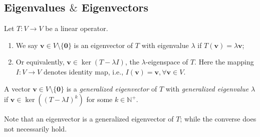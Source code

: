 \subsection{Eigenvalues $\&$ Eigenvectors}
\begin{definition}[Eigenvalues]
Let $T:V\to V$ be a linear operator.
\begin{enumerate}
\item
We say $\bm v\in V\setminus\{\bm0\}$ is an eigenvector of $T$ with eigenvalue $\lambda$ if 
$T(\bm v) = \lambda\bm v$;
\item
Or equivalently, $\bm v\in\ker(T-\lambda I)$, the $\lambda$-eigenspace of $T$. Here the mapping $I:V\to V$ denotes identity map, i.e., $I(\bm v)=\bm v,\forall \bm v\in V$.
\end{enumerate}
\end{definition}
\begin{definition}
A vector $\bm v\in V\setminus\{\bm0\}$ is a \emph{generalized eigenvector} of $T$ with \emph{generalized eigenvalue} $\lambda$ 
if $\bm v\in\ker((T-\lambda I)^k)$ for some $k\in\mathbb{N}^+$.
\end{definition}
Note that an eigenvector is a generalized eigenvector of $T$; while the converse does not necessarily hold.

